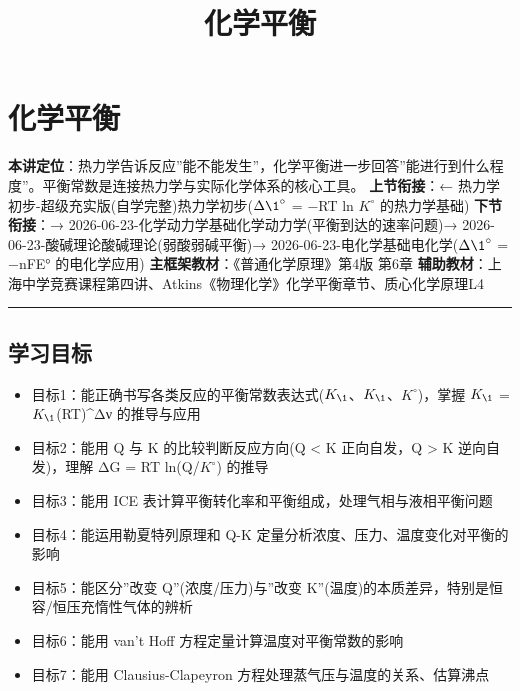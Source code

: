 \documentclass[a4paper,11pt]{ctexart}
\title{化学平衡}
\date{}
\providecommand{\tightlist}{\setlength{\itemsep}{0pt}\setlength{\parskip}{0pt}}
\begin{document}
\maketitle
\tableofcontents
\newpage
\section{化学平衡}\label{ux5316ux5b66ux5e73ux8861}

\textbf{本讲定位}：热力学告诉反应''能不能发生''，化学平衡进一步回答''能进行到什么程度''。平衡常数是连接热力学与实际化学体系的核心工具。
\textbf{上节衔接}：← 热力学初步-超级充实版(自学完整)\textbar 热力学初步(\(\Delta \1^{\circ}\) = −RT ln \(K^{\circ}\) 的热力学基础)
\textbf{下节衔接}：→ 2026-06-23-化学动力学基础\textbar 化学动力学(平衡到达的速率问题)→ 2026-06-23-酸碱理论\textbar 酸碱理论(弱酸弱碱平衡)→ 2026-06-23-电化学基础\textbar 电化学(\(\Delta \1^{\circ}\) = −nFE° 的电化学应用)
\textbf{主框架教材}：《普通化学原理》第4版 第6章
\textbf{辅助教材}：上海中学竞赛课程第四讲、Atkins《物理化学》化学平衡章节、质心化学原理L4

\begin{center}\rule{0.5\linewidth}{0.5pt}\end{center}

\subsection{学习目标}\label{ux5b66ux4e60ux76eeux6807}

\begin{itemize}
\tightlist
\item
  目标1：能正确书写各类反应的平衡常数表达式(\(K_{\1}\)、\(K_{\1}\)、\(K^{\circ}\))，掌握 \(K_{\1}\) = \(K_{\1}\)(RT)\^{}Δν 的推导与应用
\item
  目标2：能用 Q 与 K 的比较判断反应方向(Q \textless{} K 正向自发，Q \textgreater{} K 逆向自发)，理解 ΔG = RT ln(Q/\(K^{\circ}\)) 的推导
\item
  目标3：能用 ICE 表计算平衡转化率和平衡组成，处理气相与液相平衡问题
\item
  目标4：能运用勒夏特列原理和 Q-K 定量分析浓度、压力、温度变化对平衡的影响
\item
  目标5：能区分''改变 Q''(浓度/压力)与''改变 K''(温度)的本质差异，特别是恒容/恒压充惰性气体的辨析
\item
  目标6：能用 van't Hoff 方程定量计算温度对平衡常数的影响
\item
  目标7：能用 Clausius-Clapeyron 方程处理蒸气压与温度的关系、估算沸点
\end{itemize}
\end{document}
